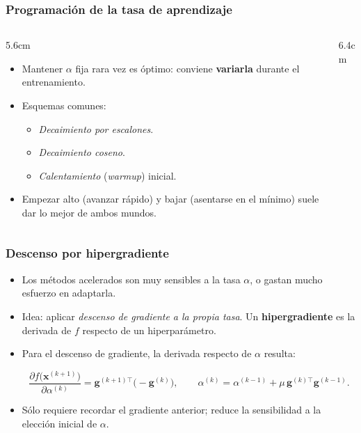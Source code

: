 \documentclass[aspectratio=169, 10pt]{beamer}
\newcommand{\gv}{\bm{g}}
\newcommand{\xv}{\bm{x}}
\newcommand{\formula}[1]{%
	\begin{tcolorbox}[colback=UCMBlue!8, colframe=UCMBlue, arc=4pt,
		boxsep=2pt, left=6pt, right=6pt, top=3pt, bottom=3pt]
		#1
	\end{tcolorbox}
}
\begin{document}
\begin{frame}
\frametitle{Programaci\'on de la tasa de aprendizaje}
\begin{columns}[T]
\begin{column}{5.6cm}
\begin{itemize}
	\item Mantener $\alpha$ fija rara vez es \'optimo: conviene \textbf{variarla} durante el entrenamiento.
	\item Esquemas comunes:
	\begin{itemize}
		\item \emph{Decaimiento por escalones}.
		\item \emph{Decaimiento coseno}.
		\item \emph{Calentamiento} (\emph{warmup}) inicial.
	\end{itemize}
	\item Empezar alto (avanzar r\'apido) y bajar (asentarse en el m\'inimo) suele dar lo mejor de ambos mundos.
\end{itemize}
\end{column}
\begin{column}{6.4cm}
\begin{center}
\end{center}
\end{column}
\end{columns}
\end{frame}

\begin{frame}
\frametitle{Descenso por hipergradiente}
\begin{itemize}
	\item Los m\'etodos acelerados son muy sensibles a la tasa $\alpha$, o gastan mucho esfuerzo en adaptarla.
	\pause
	\item Idea: aplicar \emph{descenso de gradiente a la propia tasa}. Un \textbf{hipergradiente} es la derivada de $f$ respecto de un hiperpar\'ametro.
	\pause
	\item Para el descenso de gradiente, la derivada respecto de $\alpha$ resulta:
	\formula{\[
	\frac{\partial f\big(\xv^{(k+1)}\big)}{\partial \alpha^{(k)}}
	= \gv^{(k+1)\top}\big(-\gv^{(k)}\big),
	\qquad
	\alpha^{(k)} = \alpha^{(k-1)} + \mu\,\gv^{(k)\top}\gv^{(k-1)}.
	\]}
	\pause
	\item S\'olo requiere recordar el gradiente anterior; reduce la sensibilidad a la elecci\'on inicial de $\alpha$.
\end{itemize}
\end{frame}
\end{document}
